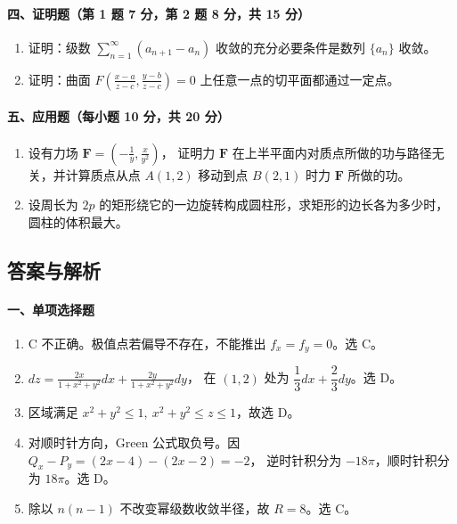 \paragraph*{四、证明题（第 1 题 7 分，第 2 题 8 分，共 15 分）}

\begin{enumerate}
  \item 证明：级数 $\sum_{n=1}^{\infty}(a_{n+1}-a_n)$ 收敛的充分必要条件是数列 $\{a_n\}$ 收敛。

  \item 证明：曲面 \(\displaystyle F\left(\frac{x-a}{z-c},\frac{y-b}{z-c}\right)=0\)
  上任意一点的切平面都通过一定点。
\end{enumerate}

\paragraph*{五、应用题（每小题 10 分，共 20 分）}

\begin{enumerate}
  \item 设有力场 \(\displaystyle \mathbf F=\left(-\frac1y,\frac{x}{y^2}\right)\)，
  证明力 $\mathbf F$ 在上半平面内对质点所做的功与路径无关，并计算质点从点 $A(1,2)$ 移动到点 $B(2,1)$ 时力 $\mathbf F$ 所做的功。

  \item 设周长为 $2p$ 的矩形绕它的一边旋转构成圆柱形，求矩形的边长各为多少时，圆柱的体积最大。
\end{enumerate}

\subsection{答案与解析}

\paragraph*{一、单项选择题}
\begin{enumerate}
  \item C 不正确。极值点若偏导不存在，不能推出 $f_x=f_y=0$。选 C。
  \item \(\displaystyle dz=\frac{2x}{1+x^2+y^2}dx+\frac{2y}{1+x^2+y^2}dy\)，
  在 $(1,2)$ 处为 $\dfrac13dx+\dfrac23dy$。选 D。
  \item 区域满足 $x^2+y^2\le1,\ x^2+y^2\le z\le1$，故选 D。
  \item 对顺时针方向，Green 公式取负号。因
  \(\displaystyle Q_x-P_y=(2x-4)-(2x-2)=-2\)，
  逆时针积分为 $-18\pi$，顺时针积分为 $18\pi$。选 D。
  \item 除以 $n(n-1)$ 不改变幂级数收敛半径，故 $R=8$。选 C。
\end{enumerate}

